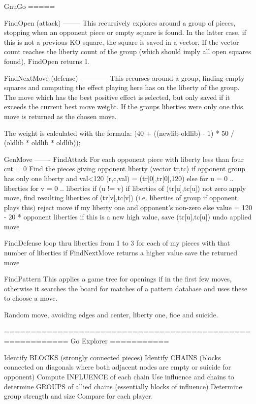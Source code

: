 GnuGo
=====

FindOpen (attack)
--------
This recursively explores around a group of pieces, stopping
when an opponent piece or empty square is found. In the latter
case, if this is not a previous KO square, the square is saved in
a vector. If the vector count reaches the liberty count of the 
group (which should imply all open squares found), FindOpen returns 1.

FindNextMove (defense)
------------
   This recurses around a group, finding empty squares and computing
   the effect playing here has on the liberty of the group. The move
   which has the best positive effect is selected, but only saved if
   it exceeds the current best move weight. If the groups liberties
   were only one this move is returned as the chosen move.

   The weight is calculated with the formula:
       (40 + ((newlib-oldlib) - 1) * 50 / (oldlib * oldlib * oldlib));
      
GenMove
-------
FindAttack
   For each opponent piece with liberty less than four
      cnt = 0
      Find the pieces giving opponent liberty (vector tr,tc)
      if opponent group has only one liberty and val<120
         (r,c,val) = (tr[0],tr[0],120)
      else 
	 for u = 0 .. liberties
	    for v = 0 .. liberties
	       if (u != v)
	          if liberties of (tr[u],tc[u]) not zero
                     apply move, find resulting liberties of (tr[v],tc[v])
                        (i.e. liberties of group if opponent plays this)
                     reject move if my liberty one and opponent's non-zero
                     else value = 120 - 20 * opponent liberties
                     if this is a new high value, save (tr[u],tc[u])
                     undo applied move

FindDefense
   loop thru liberties from 1 to 3
      for each of my pieces with that number of liberties
         if FindNextMove returns a higher value
            save the returned move

FindPattern
   This applies a game tree for openings if in the first few moves,
   otherwise it searches the board for matches of a pattern database
   and uses these to choose a move.

Random move, avoiding edges and center, liberty one, fioe and suicide.

==========================================================
Go Explorer
===========

Identify BLOCKS (strongly connected pieces)
Identify CHAINS (blocks connected on diagonals where both adjacent
	nodes are empty or suicide for opponent)
Compute INFLUENCE of each chain
Use influence and chains to determine GROUPS of allied chains
	(essentially blocks of influence)
Determine group strength and size
Compare for each player.

